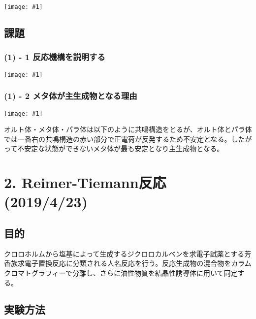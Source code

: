 \documentclass[a4paper,papersize,dvipdfmx]{jsarticle}
\newcommand{\pict}[2]{\begin{center} \texttt{[image: \#1]} \end{center}}   %
\begin{document}
\pict{imgs/1-nitro.png}{7}


\subsection*{課題}
\subsubsection*{(1) - 1 反応機構を説明する}
\pict{imgs/1-hk.jpeg}{10}

\subsubsection*{(1) - 2 メタ体が主生成物となる理由}
\pict{imgs/1-k2.jpeg}{10}
オルト体・メタ体・パラ体は以下のように共鳴構造をとるが、オルト体とパラ体では一番右の共鳴構造の赤い部分で正電荷が反発するため不安定となる。したがって不安定な状態ができないメタ体が最も安定となり主生成物となる。


\section*{2. Reimer-Tiemann反応 (2019/4/23)}
\subsection*{目的}
クロロホルムから塩基によって生成するジクロロカルベンを求電子試薬とする芳香族求電子置換反応に分類される人名反応を行う。反応生成物の混合物をカラムクロマトグラフィーで分離し、さらに油性物質を結晶性誘導体に用いて同定する。

\subsection*{実験方法}
\end{document}
